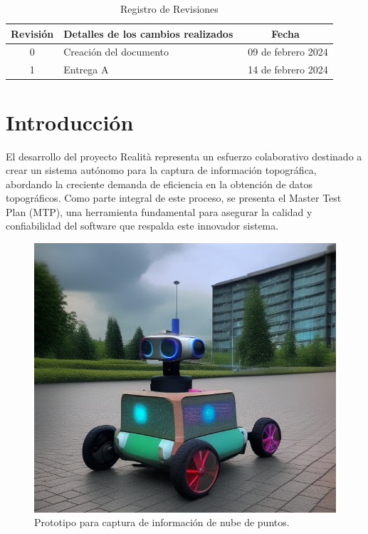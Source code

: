 \documentclass[12pt,a4paper, twoside]{article} %
\begin{document}
\begin{table}[ht]
  \centering
  \caption{Registro de Revisiones}
  \label{tab:registro}
  \begin{tabularx}{\linewidth}{|c|X|c|}
    \hline
    Revisión & Detalles de los cambios realizados & Fecha \\
    \hline
    0 & Creación del documento & \ 09 de febrero 2024 \\
    \hline
    1 & Entrega A & \ 14 de febrero 2024 \\
    \hline
  \end{tabularx}
\end{table}

\maketitle
\tableofcontents

\newpage

\section{Introducción}
\label{sec:org60390fa}

El desarrollo del proyecto Realità representa un esfuerzo colaborativo destinado a crear un sistema autónomo para la captura de información topográfica, abordando la creciente demanda de eficiencia en la obtención de datos topográficos. Como parte integral de este proceso, se presenta el Master Test Plan (MTP), una herramienta fundamental para asegurar la calidad y confiabilidad del software que respalda este innovador sistema.


\begin{figure}[htpb]
\centering
\includegraphics[width=1\textwidth]{./Figuras/Prototipo.png}
\caption{Prototipo para captura de información de nube de puntos.}
\label{fig:diagBloques}
\end{figure}
\end{document}
